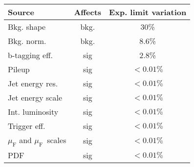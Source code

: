 \documentclass[border=5pt]{standalone}
\begin{document}
  \minipage{18cm}

  \centering
  \small
  
  \begin{tabular}{l c c}
   \hline
   Source        & Affects  & Exp. limit variation \\
   \hline
   Bkg. shape     & bkg.  & 30\%  \\
   Bkg. norm.     & bkg.  & 8.6\%  \\
   b-tagging eff. & sig  & 2.8\%  \\
   Pileup        & sig  &       ${<} 0.01\%$ \\
   Jet energy res.  & sig  &    ${<} 0.01\%$ \\
   Jet energy scale  & sig  &  ${<} 0.01\%$ \\
   Int. luminosity    & sig  & ${<} 0.01\%$ \\
   Trigger eff.  & sig  &      ${<} 0.01\%$ \\
   $\mu_\textrm{F}$ and $\mu_\textrm{F}$\ scales  & sig  & ${<} 0.01\%$ \\
   PDF           & sig  &       ${<} 0.01\%$ \\
   \hline
 \end{tabular}

  \endminipage
\end{document}
